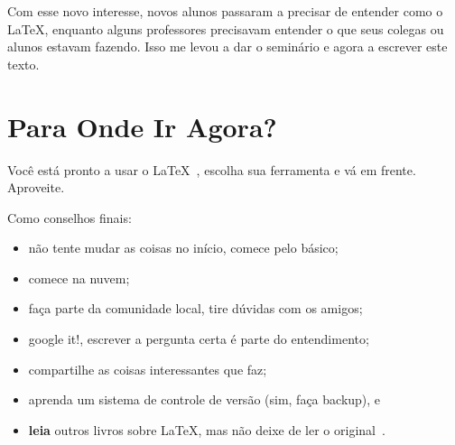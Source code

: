 \documentclass[12pt,a4paper]{book}
\begin{document}
Com esse novo interesse, novos alunos passaram a precisar de entender como o \LaTeX, enquanto alguns professores precisavam entender o que seus colegas ou alunos estavam fazendo. Isso me levou a dar o seminário e agora a escrever este texto.
 









\chapter{Para Onde Ir Agora?}

Você está pronto a usar o \LaTeX\ , escolha sua ferramenta e vá em frente. Aproveite.

Como conselhos finais:
\begin{itemize}
    \item não tente mudar as coisas no início, comece pelo básico;
    \item comece na nuvem;
    \item faça parte da comunidade local, tire dúvidas com os amigos;
    \item google it!, escrever a pergunta certa é parte do entendimento;
    \item compartilhe as coisas interessantes que faz;
    \item aprenda um sistema de controle de versão (sim, faça backup), e
    \item \textbf{leia} outros livros sobre \LaTeX, mas não deixe de ler o original~\parencite{latex:userguide}.
\end{itemize}

\printbibliography
\end{document}
